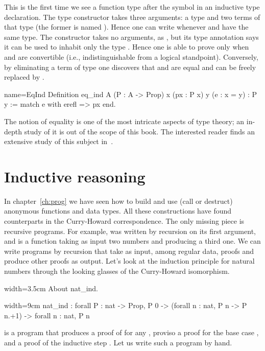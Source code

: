 This is the first time we see a function type after the \C{:} symbol
in an inductive type declaration.
The  type constructor takes three arguments: a type  and
two terms of that type (the former is named ).
Hence one can write  whenever  and 
have the same type.
The  constructor takes no arguments, as , but its type
annotation says it can be used to inhabit only the type .
Hence one is able to prove  only when  and  are
convertible
(i.e., indistinguishable from a logical standpoint).
Conversely, by eliminating a term
of type  one discovers that   and  are
equal and  can be freely replaced by .

\begin{coq}{name=EqInd}{}
Definition eq_ind A (P : A -> Prop) x (px : P x) y (e : x = y) : P y :=
  match e with erefl => px end.
\end{coq}

The notion of equality is one of the most intricate aspects of type
theory; an in-depth study of it is out of the scope of this book.  The interested reader
finds an extensive study of this subject in~\cite{hottbook}.  %


\section{Inductive reasoning}\label{ssec:indreason}

In chapter~\ref{ch:prog} we have seen how to build and use (call or destruct)
anonymous functions and data types.  All these
constructions have found counterparts in the Curry-Howard correspondence.
The only missing piece is recursive programs.  For example,
 was written by recursion on its first argument, and is a
function taking as input two numbers and producing a third one.
We can write programs by recursion that take as input, among regular  data,
proofs and produce  other proofs as output.  Let's look at the
induction principle for natural numbers through the looking glasses of the
Curry-Howard isomorphism.

\begin{coq}{}{width=3.5cm}
About nat_ind.
\end{coq}
\begin{coqout}{}{width=9cm}
nat_ind : forall P : nat -> Prop,
  P 0 -> (forall n : nat, P n -> P n.+1) -> forall n : nat, P n
\end{coqout}
 is a program that produces a proof of  for any ,
proviso a proof for the base case , and a proof
of the inductive step .
Let us write such a program by hand.

